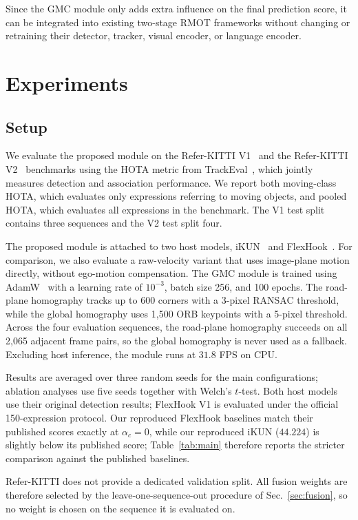 \documentclass{article}
\begin{document}
Since the GMC module only adds extra influence on the final prediction score, it can be integrated into existing two-stage RMOT frameworks without changing or retraining their detector, tracker, visual encoder, or language encoder.

\section{Experiments}
\label{sec:exp}

\subsection{Setup}
\label{sec:setup}
We evaluate the proposed module on the Refer-KITTI V1~\cite{transrmot} and the Refer-KITTI V2~\cite{temprmot} benchmarks using the HOTA metric from TrackEval~\cite{hota}, which jointly measures detection and association performance. We report both moving-class HOTA, which evaluates only expressions referring to moving objects, and pooled HOTA, which evaluates all expressions in the benchmark. The V1 test split contains three sequences and the V2 test split four.

The proposed module is attached to two host models, iKUN~\cite{ikun} and FlexHook~\cite{flexhook}. For comparison, we also evaluate a raw-velocity variant that uses image-plane motion directly, without ego-motion compensation. The GMC module is trained using AdamW~\cite{adamw} with a learning rate of $10^{-3}$, batch size 256, and 100 epochs. The road-plane homography tracks up to 600 corners with a 3-pixel RANSAC threshold, while the global homography uses 1,500 ORB keypoints with a 5-pixel threshold. Across the four evaluation sequences, the road-plane homography succeeds on all 2,065 adjacent frame pairs, so the global homography is never used as a fallback. Excluding host inference, the module runs at $31.8$ FPS on CPU.

Results are averaged over three random seeds for the main configurations; ablation analyses use five seeds together with Welch's $t$-test. Both host models use their original detection results; FlexHook V1 is evaluated under the official 150-expression protocol. Our reproduced FlexHook baselines match their published scores exactly at $\alpha_c{=}0$, while our reproduced iKUN ($44.224$) is slightly below its published score; Table~\ref{tab:main} therefore reports the stricter comparison against the published baselines.

Refer-KITTI does not provide a dedicated validation split. All fusion weights are therefore selected by the leave-one-sequence-out procedure of Sec.~\ref{sec:fusion}, so no weight is chosen on the sequence it is evaluated on.
\end{document}
